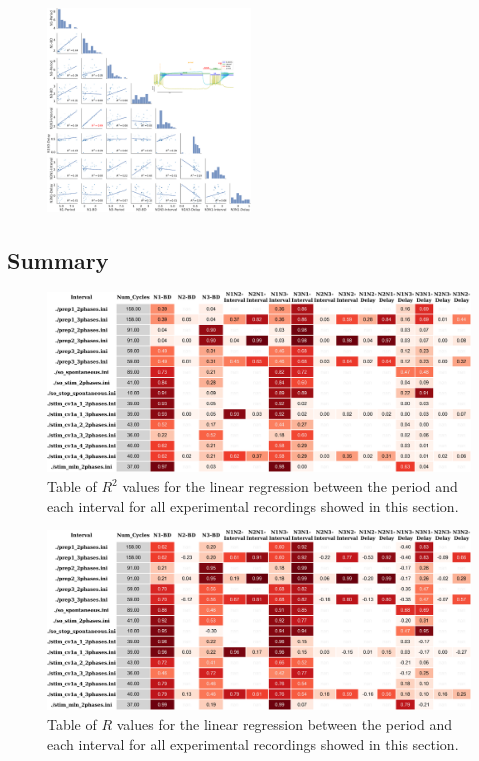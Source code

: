 \begin{figure}[htbp]
	\includegraphics[width=0.48\textwidth]{./invariants/data/SUSSEX/CV1a_driven4/images/2phases/panel_with_pairplot.pdf}
	\caption{}
	\label{fig:cv1a pairplot comparison}
\end{figure}




\subsection{Summary}
\begin{figure}
	\includegraphics[width=\textwidth]{./invariants/styled_table_invariants_r-squared.pdf}
	\caption{Table of $R^2$ values for the linear regression between the period and each interval for all experimental recordings showed in this section.}
	\label{fig:R2 table}
\end{figure}

\begin{figure}
	\includegraphics[width=\textwidth]{./invariants/styled_table_invariants_r-value.pdf}
	\caption{Table of $R$ values for the linear regression between the period and each interval for all experimental recordings showed in this section.}
	\label{fig:R table}
\end{figure}


\clearpage
\newpage
